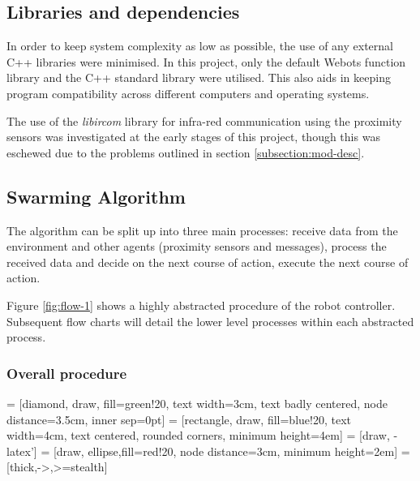 \subsection{Libraries and dependencies}

In order to keep system complexity as low as possible, the use of any external C++ libraries were minimised. In this project, only the default Webots function library and the C++ standard library were utilised. This also aids in keeping program compatibility across different computers and operating systems.

The use of the \textit{libircom} library for infra-red communication using the proximity sensors was investigated at the early stages of this project, though this was eschewed due to the problems outlined in section \ref{subsection:mod-desc}.

\subsection{Swarming Algorithm}

The algorithm can be split up into three main processes: receive data from the environment and other agents (proximity sensors and messages), process the received data and decide on the next course of action, execute the next course of action.

Figure \ref{fig:flow-1} shows a highly abstracted procedure of the robot controller. Subsequent flow charts will detail the lower level processes within each abstracted process.
\clearpage
\subsubsection{Overall procedure}

 = [diamond, draw, fill=green!20,
text width=3cm, text badly centered, node distance=3.5cm, inner sep=0pt]
 = [rectangle, draw, fill=blue!20,
text width=4cm, text centered, rounded corners, minimum height=4em]
 = [draw, -latex']
 = [draw, ellipse,fill=red!20, node distance=3cm,
minimum height=2em]
 = [thick,->,>=stealth]

